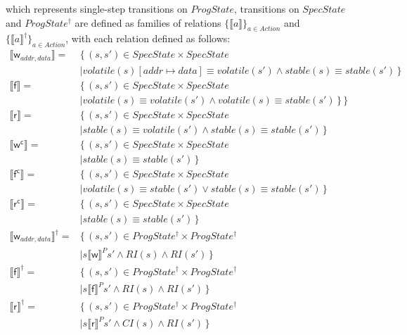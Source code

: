 \documentclass[a4paper,11pt]{article}
\theoremstyle{definition}
\begin{document}
which represents single-step transitions on $\mathit{ProgState}$,
transitions on $\mathit{SpecState}$ and $\mathit{ProgState^\dagger}$ are defined as families of relations $\{ \llbracket a \rrbracket \}_\mathit{a \in Action}$ and $\{ \llbracket a \rrbracket^\dagger \}_\mathit{a \in Action}$, with each relation defined as follows:
\begin{align*}
	\llbracket \mathsf w_{addr, data} \rrbracket ={}& \{\, (s, s') \in SpecState \times SpecState\\ &\mid \mathit{volatile(s)[addr \mapsto data]} \equiv \mathit{volatile(s')}
	\land stable(s) \equiv stable(s') \,\} \\
	\llbracket \mathsf f \rrbracket ={}& \{\, (s, s') \in SpecState \times SpecState\\ & \mid \mathit{volatile(s)} \equiv \mathit{volatile(s')} \land \mathit{volatile(s)} \equiv \mathit{stable(s')}\,\} \,\} \\
	\llbracket \mathsf r \rrbracket ={}& \{\, (s, s') \in SpecState \times SpecState\\ & \mid\mathit{stable(s)} \equiv \mathit{volatile(s')} \land \mathit{stable(s)} \equiv \mathit{stable(s')} \,\} \\
	\llbracket \mathsf {w^c} \rrbracket ={}& \{\, (s, s') \in SpecState \times SpecState\\ & \mid\mathit{stable(s)} \equiv \mathit{stable(s')} \,\} \\
	\llbracket \mathsf {f^c} \rrbracket ={}& \{\, (s, s') \in SpecState \times SpecState\\ & \mid\mathit{volatile(s)} \equiv \mathit{stable(s')} \lor \mathit{stable(s)} \equiv \mathit{stable(s')} \,\} \\
	\llbracket \mathsf {r^c} \rrbracket ={}& \{\, (s, s') \in SpecState \times SpecState\\ & \mid\mathit{stable(s)} \equiv \mathit{stable(s')} \,\} \\
	\llbracket \mathsf w_{addr, data} \rrbracket^\dagger ={}& \{\, (s, s') \in ProgState^\dagger \times ProgState^\dagger\\ &\mid s \llbracket \mathsf w \rrbracket^P s' \land \mathit{RI(s)} \land \mathit{RI(s')} \,\} \\
	\llbracket \mathsf f \rrbracket^\dagger ={}& \{\, (s, s') \in ProgState^\dagger \times ProgState^\dagger\\ &\mid s \llbracket \mathsf f \rrbracket^P s' \land \mathit{RI(s)} \land \mathit{RI(s')} \,\} \\
	\llbracket \mathsf r \rrbracket^\dagger ={}& \{\, (s, s') \in ProgState^\dagger \times ProgState^\dagger\\ &\mid s \llbracket \mathsf r \rrbracket^P s' \land \mathit{CI(s)} \land \mathit{RI(s')} \,\} \\

\end{align*}
\end{document}
